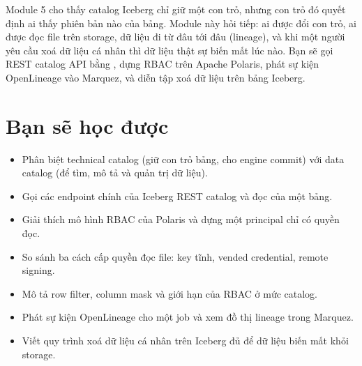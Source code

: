 
Module 5 cho thấy catalog Iceberg chỉ giữ một con trỏ, nhưng con trỏ đó quyết định ai thấy phiên bản nào của bảng. Module này hỏi tiếp: ai được đổi con trỏ, ai được đọc file trên storage, dữ liệu đi từ đâu tới đâu (lineage), và khi một người yêu cầu xoá dữ liệu cá nhân thì dữ liệu thật sự biến mất lúc nào. Bạn sẽ gọi REST catalog API bằng , dựng RBAC trên Apache Polaris, phát sự kiện OpenLineage vào Marquez, và diễn tập xoá dữ liệu trên bảng Iceberg.

\section{Bạn sẽ học được}
\begin{itemize}
  \item Phân biệt technical catalog (giữ con trỏ bảng, cho engine commit) với data catalog (để tìm, mô tả và quản trị dữ liệu).
  \item Gọi các endpoint chính của Iceberg REST catalog và đọc  của một bảng.
  \item Giải thích mô hình RBAC của Polaris và dựng một principal chỉ có quyền đọc.
  \item So sánh ba cách cấp quyền đọc file: key tĩnh, vended credential, remote signing.
  \item Mô tả row filter, column mask và giới hạn của RBAC ở mức catalog.
  \item Phát sự kiện OpenLineage cho một job và xem đồ thị lineage trong Marquez.
  \item Viết quy trình xoá dữ liệu cá nhân trên Iceberg đủ để dữ liệu biến mất khỏi storage.
\end{itemize}

